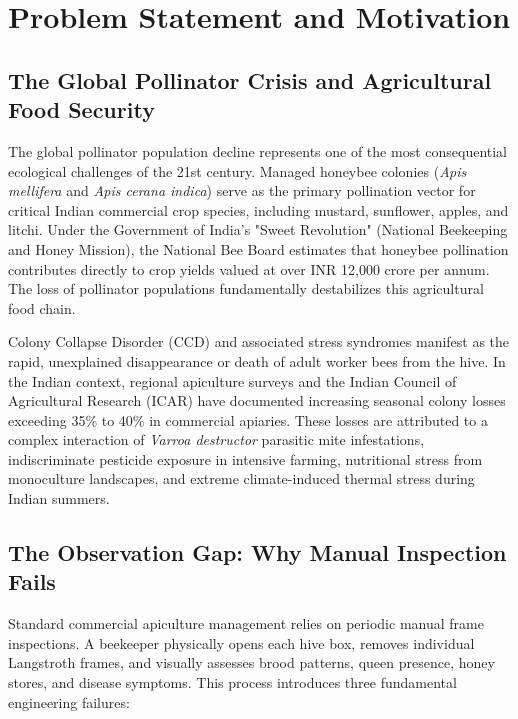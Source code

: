 \documentclass[12pt,a4paper]{article}
\begin{document}
\section{Problem Statement and Motivation}

\subsection{The Global Pollinator Crisis and Agricultural Food Security}

The global pollinator population decline represents one of the most consequential ecological challenges of the 21st century. Managed honeybee colonies (\textit{Apis mellifera} and \textit{Apis cerana indica}) serve as the primary pollination vector for critical Indian commercial crop species, including mustard, sunflower, apples, and litchi. Under the Government of India's "Sweet Revolution" (National Beekeeping and Honey Mission), the National Bee Board estimates that honeybee pollination contributes directly to crop yields valued at over INR 12,000 crore per annum. The loss of pollinator populations fundamentally destabilizes this agricultural food chain.

Colony Collapse Disorder (CCD) and associated stress syndromes manifest as the rapid, unexplained disappearance or death of adult worker bees from the hive. In the Indian context, regional apiculture surveys and the Indian Council of Agricultural Research (ICAR) have documented increasing seasonal colony losses exceeding 35\% to 40\% in commercial apiaries. These losses are attributed to a complex interaction of \textit{Varroa destructor} parasitic mite infestations, indiscriminate pesticide exposure in intensive farming, nutritional stress from monoculture landscapes, and extreme climate-induced thermal stress during Indian summers.

\subsection{The Observation Gap: Why Manual Inspection Fails}

Standard commercial apiculture management relies on periodic manual frame inspections. A beekeeper physically opens each hive box, removes individual Langstroth frames, and visually assesses brood patterns, queen presence, honey stores, and disease symptoms. This process introduces three fundamental engineering failures:
\end{document}
